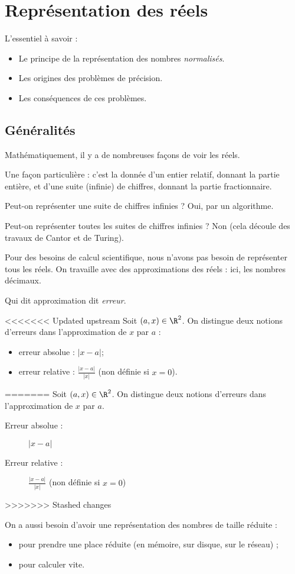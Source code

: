 \section{Représentation des réels}

L'essentiel à savoir :
\begin{itemize}
\item[\textbullet] Le principe de la représentation des nombres \emph{normalisés}.
\item[\textbullet] Les origines des problèmes de précision.
\item[\textbullet] Les conséquences de ces problèmes.
\end{itemize}
\subsection{Généralités}
Mathématiquement, il y a de nombreuses façons de voir les réels.

Une façon particulière : c'est la donnée d'un entier relatif, donnant la partie entière, et d'une
suite (infinie) de chiffres, donnant la partie fractionnaire.

Peut-on représenter une suite de chiffres infinies ? Oui, par un algorithme.

Peut-on représenter toutes les suites de chiffres infinies ? Non (cela découle des travaux de Cantor et de  Turing).

Pour des besoins de calcul scientifique, nous n'avons pas besoin de représenter tous les réels. On travaille avec des approximations des réels : ici, les nombres décimaux.
\begin{rem}
  Qui dit approximation dit \emph{erreur}.
\end{rem}
\begin{defi}{}
<<<<<<< Updated upstream
Soit $(a,x)\in\R^2$. On distingue deux notions d'erreurs dans l'approximation de $x$ par $a$ :
\begin{itemize}
\item erreur absolue : $|x-a|$;
\item erreur relative :  $\displaystyle\frac{|x-a|}{|x|}$ (non définie si $x=0$).
\end{itemize}
=======
Soit $(a,x)\in\R^2$. On distingue deux notions d'erreurs dans l'approximation de $x$ par $a$.
\begin{description}
\item[Erreur absolue :] $|x-a|$ 
\item[Erreur relative :]  $\displaystyle\frac{|x-a|}{|x|}$ (non définie si $x=0$)
\end{description}
>>>>>>> Stashed changes
\end{defi}
On a aussi besoin d'avoir une représentation des nombres de taille réduite :
\begin{itemize}
\item[\textbullet] pour prendre une place réduite (en mémoire, sur disque, sur le réseau) ;
\item[\textbullet] pour calculer vite.
\end{itemize}

